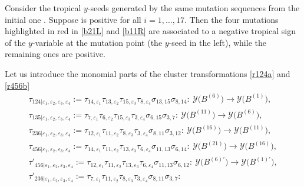 \documentclass[pdftex]{sigma}
\numberwithin{equation}{section}
\begin{document}
\begin{Remark}\label{re:red}
 Consider the tropical $y$-seeds generated by the same mutation
 sequences from the initial one
 . Suppose
  is positive for all $i=1, \dots,
 17$. Then the four mutations highlighted in red in \eqref{b21L}
 and \eqref{b11R} are associated to a negative tropical sign of the
 $y$-variable at the mutation point (the $y$-seed in the left), while
 the remaining ones are positive.
\end{Remark}

Let us introduce the monomial parts of the cluster transformations \eqref{r124a} and \eqref{r456b}
\begin{gather*}
\tau_{124 | \varepsilon_1,\varepsilon_2,\varepsilon_3,\varepsilon_4} :=
\tau_{14,\varepsilon_1}\tau_{13,\varepsilon_2}\tau_{15,\varepsilon_3}\tau_{8,\varepsilon_4}\sigma_{13,15}\sigma_{8,14}\colon\
 \mathcal{Y}\bigl(B^{(6)}\bigr) \rightarrow \mathcal{Y}\bigl(B^{(1)}\bigr),
\\
\tau_{135 | \varepsilon_1,\varepsilon_2,\varepsilon_3,\varepsilon_4} :=
\tau_{7,\varepsilon_1}\tau_{6,\varepsilon_2}\tau_{15,\varepsilon_3}\tau_{3,\varepsilon_4}\sigma_{6,15}\sigma_{3,7}\colon\
 \mathcal{Y}\bigl(B^{(11)}\bigr) \rightarrow \mathcal{Y}\bigl(B^{(6)}\bigr),
\\
\tau_{236 | \varepsilon_1,\varepsilon_2,\varepsilon_3,\varepsilon_4} :=
\tau_{12,\varepsilon_1}\tau_{11,\varepsilon_2}\tau_{8,\varepsilon_3}\tau_{3,\varepsilon_4}\sigma_{8,11}\sigma_{3,12}\colon\
 \mathcal{Y}\bigl(B^{(16)}\bigr) \rightarrow \mathcal{Y}\bigl(B^{(11)}\bigr),
\\
\tau_{456 | \varepsilon_1,\varepsilon_2,\varepsilon_3,\varepsilon_4} :=
\tau_{14,\varepsilon_1}\tau_{11,\varepsilon_2}\tau_{13,\varepsilon_3}\tau_{6,\varepsilon_4}\sigma_{11,13}\sigma_{6,14}\colon\
 \mathcal{Y}\bigl(B^{(21)}\bigr) \rightarrow \mathcal{Y}\bigl(B^{(16)}\bigr),
\\
\tau'_{456 | \varepsilon_1,\varepsilon_2,\varepsilon_3,\varepsilon_4} :=
\tau_{12,\varepsilon_1}\tau_{11,\varepsilon_2}\tau_{13,\varepsilon_3}\tau_{6,\varepsilon_4}\sigma_{11,13}\sigma_{6,12}\colon\
 \mathcal{Y}\bigl(B^{(6)\prime}\bigr) \rightarrow \mathcal{Y}\bigl(B^{(1)\prime}\bigr),
\\
\tau'_{236 | \varepsilon_1,\varepsilon_2,\varepsilon_3,\varepsilon_4} :=
\tau_{7,\varepsilon_1}\tau_{11,\varepsilon_2}\tau_{8,\varepsilon_3}\tau_{3,\varepsilon_4}\sigma_{8,11}\sigma_{3,7}\colon\

\end{gather*}
\end{document}

